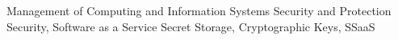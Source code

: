 \documentclass[10pt]{socc}
\begin{document}
         {Management of Computing and Information Systems}
         {Security and Protection}
\terms
Security, Software as a Service
\keywords
Secret Storage, Cryptographic Keys, SSaaS








{
  
  \softraggedright
  
}
\end{document}
